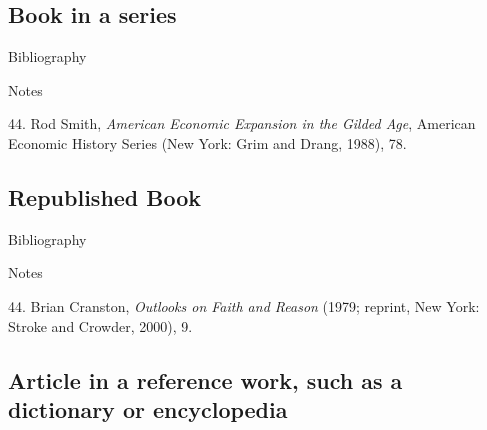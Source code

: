 \subsection{Book in a series}

\begin{center}{Bibliography}\end{center} 

\begin{singlespace}
\noindent{}
\end{singlespace}


\begin{center}{Notes}\end{center} 

\begin{singlespace}
\noindent\hspace{1.2cm}44. Rod Smith,
\emph{American Economic Expansion in the Gilded Age}, American Economic History
Series (New York: Grim and Drang, 1988), 78.
\end{singlespace}

\subsection{Republished Book}

\begin{singlespace}
\begin{center}{Bibliography}\end{center} \noindent{}
\end{singlespace}

\begin{center}{Notes}\end{center} 

\begin{singlespace}
\noindent\hspace{1.2cm}44. Brian Cranston,
\emph{Outlooks on Faith and Reason} (1979; reprint, New York: Stroke and
Crowder, 2000), 9.
\end{singlespace}


\subsection{Article in a reference work, such as a dictionary or encyclopedia}

